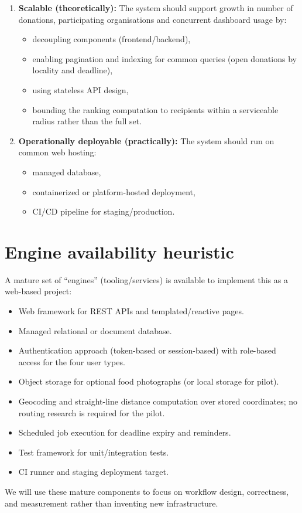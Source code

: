 \documentclass[11pt,a4paper]{article}
\begin{document}
\begin{enumerate}[leftmargin=0.7cm]
    \item \textbf{Scalable (theoretically):} The system should support growth in number of donations, participating organisations and concurrent dashboard usage by:
    \begin{itemize}[leftmargin=0.7cm]
        \item decoupling components (frontend/backend),
        \item enabling pagination and indexing for common queries (open donations by locality and deadline),
        \item using stateless API design,
        \item bounding the ranking computation to recipients within a serviceable radius rather than the full set.
    \end{itemize}

    \item \textbf{Operationally deployable (practically):} The system should run on common web hosting:
    \begin{itemize}[leftmargin=0.7cm]
        \item managed database,
        \item containerized or platform-hosted deployment,
        \item CI/CD pipeline for staging/production.
    \end{itemize}
\end{enumerate}

\section{Engine availability heuristic}
A mature set of ``engines'' (tooling/services) is available to implement this as a web-based project:
\begin{itemize}[leftmargin=0.7cm]
    \item Web framework for REST APIs and templated/reactive pages.
    \item Managed relational or document database.
    \item Authentication approach (token-based or session-based) with role-based access for the four user types.
    \item Object storage for optional food photographs (or local storage for pilot).
    \item Geocoding and straight-line distance computation over stored coordinates; no routing research is required for the pilot.
    \item Scheduled job execution for deadline expiry and reminders.
    \item Test framework for unit/integration tests.
    \item CI runner and staging deployment target.
\end{itemize}
We will use these mature components to focus on workflow design, correctness, and measurement rather than inventing new infrastructure.
\end{document}

